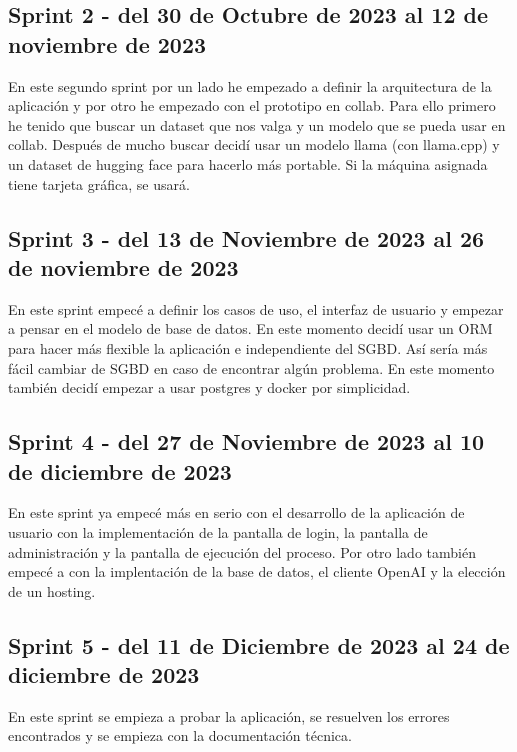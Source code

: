 \subsection{Sprint 2 - del 30 de Octubre de 2023 al 12 de noviembre de 2023}
En este segundo sprint por un lado he empezado a definir la arquitectura de la aplicación 
y por otro he empezado con el prototipo en collab. Para ello primero he tenido que buscar 
un dataset que nos valga y un modelo que se pueda usar en collab.
Después de mucho buscar decidí usar un modelo llama (con llama.cpp) y un dataset de hugging face 
para hacerlo más portable.
Si la máquina asignada tiene tarjeta gráfica, se usará.

\subsection{Sprint 3 - del 13 de Noviembre de 2023 al 26 de noviembre de 2023}
En este sprint empecé a definir los casos de uso, el interfaz de usuario y empezar a pensar 
en el modelo de base de datos. En este momento decidí usar un ORM para hacer más flexible la 
aplicación e independiente del SGBD. Así sería más fácil cambiar de SGBD en caso de encontrar 
algún problema. En este momento también decidí empezar a usar postgres y docker por simplicidad.

\subsection{Sprint 4 - del 27 de Noviembre de 2023 al 10 de diciembre de 2023}
En este sprint ya empecé más en serio con el desarrollo de la aplicación de usuario con
la implementación de la pantalla de login, la pantalla de administración y la pantalla 
de ejecución del proceso.
Por otro lado también empecé a con la implentación de la base de datos, el cliente OpenAI y 
la elección de un hosting.
\subsection{Sprint 5 - del 11 de Diciembre de 2023 al 24 de diciembre de 2023}
En este sprint se empieza a probar la aplicación, se 
resuelven los errores encontrados y 
se empieza con la documentación técnica.
